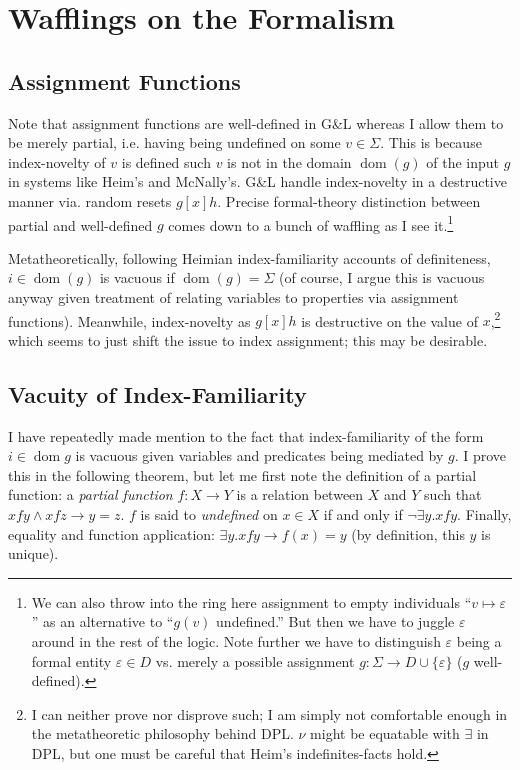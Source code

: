\documentclass[11pt]{article}
\DeclareMathOperator{\dom}{dom}
\begin{document}
\section{Wafflings on the Formalism}\label{sec:wafflings}
\subsection{Assignment Functions}\label{sec:assignments}
Note that assignment functions are well-defined in G\&L whereas I allow them to be merely partial, i.e. having being undefined on some \(v \in \Sigma\). This is because index-novelty of \(v\) is defined such \(v\) is not in the domain \(\dom(g)\) of the input \(g\) in systems like Heim's and McNally's. G\&L handle index-novelty in a destructive manner via. random resets \(g[x]h\). Precise formal-theory distinction between partial and well-defined \(g\) comes down to a bunch of waffling as I see it.\footnote{We can also throw into the ring here assignment to empty individuals ``\(v \mapsto \varepsilon\)'' as an alternative to ``\(g(v)\) undefined.'' But then we have to juggle \(\varepsilon\) around in the rest of the logic. Note further we have to distinguish \(\varepsilon\) being a formal entity \(\varepsilon \in D\) vs. merely a possible assignment \(g : \Sigma \to D \cup \{\varepsilon\}\) (\(g\) well-defined).}

Metatheoretically, following Heimian index-familiarity accounts of definiteness, \(i \in \dom(g)\) is vacuous if \(\dom(g) = \Sigma\) (of course, I argue this is vacuous anyway given treatment of relating variables to properties via assignment functions). Meanwhile, index-novelty as \(g[x]h\) is destructive on the value of \(x\),\footnote{I can neither prove nor disprove such; I am simply not comfortable enough in the metatheoretic philosophy behind DPL. \(\nu\) might be equatable with \(\exists\) in DPL, but one must be careful that Heim's indefinites-facts hold.} which seems to just shift the issue to index assignment; this may be desirable.


\subsection{Vacuity of Index-Familiarity}
I have repeatedly made mention to the fact that index-familiarity of the form \(i \in \dom g\) is vacuous given variables and predicates being mediated by \(g\). I prove this in the following theorem, but let me first note the definition of a partial function: a \textit{partial function} \(f : X \to Y\) is a relation between \(X\) and \(Y\) such that \(xfy \land xfz \to y = z\). \(f\) is said to \textit{undefined} on \(x \in X\) if and only if \(\lnot \exists y . xfy\). Finally, equality and function application: \(\exists y . xfy \to f(x) = y\) (by definition, this \(y\) is unique).
\end{document}
